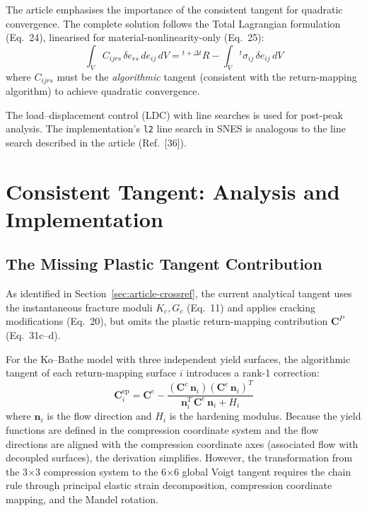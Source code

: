 The article emphasises the importance of the consistent tangent for
quadratic convergence.  The complete solution follows the Total
Lagrangian formulation (Eq.~24), linearised for material-nonlinearity-only
(Eq.~25):
\begin{equation}
  \int_V C_{ijrs}\, \delta e_{rs}\, de_{ij}\, dV
  = {}^{t+\Delta t}\!R
  - \int_V {}^t\!\sigma_{ij}\, \delta e_{ij}\, dV
\end{equation}
where $C_{ijrs}$ must be the \emph{algorithmic} tangent (consistent
with the return-mapping algorithm) to achieve quadratic convergence.

The load--displacement control (LDC) with line searches is used for
post-peak analysis.  The implementation's \texttt{l2} line search in
SNES is analogous to the line search described in the article
(Ref.~[36]).


\section{Consistent Tangent: Analysis and Implementation}
\label{sec:consistent-tangent}

\subsection{The Missing Plastic Tangent Contribution}

As identified in Section~\ref{sec:article-crossref}, the current
analytical tangent uses the instantaneous fracture moduli $K_c, G_c$
(Eq.~11) and applies cracking modifications (Eq.~20), but omits the
plastic return-mapping contribution $\mathbf{C}^P$ (Eq.~31c--d).

For the Ko--Bathe model with three independent yield surfaces, the
algorithmic tangent of each return-mapping surface $i$ introduces a
rank-1 correction:
\begin{equation}
  \mathbf{C}^{\text{ep}}_i = \mathbf{C}^e
  - \frac{(\mathbf{C}^e\, \mathbf{n}_i)
          (\mathbf{C}^e\, \mathbf{n}_i)^T}
         {\mathbf{n}_i^T\, \mathbf{C}^e\, \mathbf{n}_i + H_i}
  \label{eq:consistent-tangent-surface}
\end{equation}
where $\mathbf{n}_i$ is the flow direction and $H_i$ is the hardening
modulus.  Because the yield functions are defined in the compression
coordinate system and the flow directions are aligned with the
compression coordinate axes (associated flow with decoupled surfaces),
the derivation simplifies.  However, the transformation from the
3$\times$3 compression system to the 6$\times$6 global Voigt tangent
requires the chain rule through principal elastic strain decomposition,
compression coordinate mapping, and the Mandel rotation.

